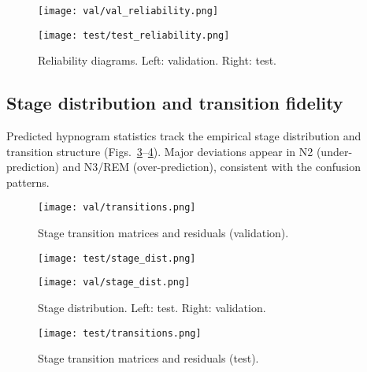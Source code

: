 \documentclass{article}
\begin{document}
\begin{figure}[t]
  \centering
  \begin{minipage}[t]{0.48\linewidth}
    \centering
    \texttt{[image: val/val\_reliability.png]}
  \end{minipage}\hfill
  \begin{minipage}[t]{0.48\linewidth}
    \centering
    \texttt{[image: test/test\_reliability.png]}
  \end{minipage}
  \caption{Reliability diagrams. Left: validation. Right: test.}
  \label{fig:reliability-both}
\end{figure}

\subsection{Stage distribution and transition fidelity}
Predicted hypnogram statistics track the empirical stage distribution and transition structure (Figs.~\ref{fig:stage-dist-both}--\ref{fig:transitions-test}). Major deviations appear in N2 (under-prediction) and N3/REM (over-prediction), consistent with the confusion patterns.


\begin{figure}[t]
  \centering
  \texttt{[image: val/transitions.png]}
  \caption{Stage transition matrices and residuals (validation).}
  \label{fig:transitions-val}
\end{figure}

\begin{figure}[t]
  \centering
  \begin{minipage}[t]{0.48\linewidth}
    \centering
    \texttt{[image: test/stage\_dist.png]}
  \end{minipage}\hfill
  \begin{minipage}[t]{0.48\linewidth}
    \centering
    \texttt{[image: val/stage\_dist.png]}
  \end{minipage}
  \caption{Stage distribution. Left: test. Right: validation.}
  \label{fig:stage-dist-both}
\end{figure}

\begin{figure}[t]
  \centering
  \texttt{[image: test/transitions.png]}
  \caption{Stage transition matrices and residuals (test).}
  \label{fig:transitions-test}
\end{figure}

\end{document}
